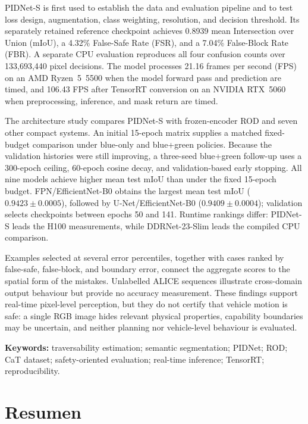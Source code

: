 \documentclass[12pt,a4paper]{report}
\begin{document}
PIDNet-S is first used to establish the data and evaluation pipeline and to
test loss design, augmentation, class weighting, resolution, and decision
threshold. Its separately retained reference checkpoint achieves 0.8939 mean
Intersection over Union (mIoU), a 4.32\% False-Safe Rate (FSR), and a 7.04\%
False-Block Rate (FBR). A separate CPU evaluation reproduces all four confusion
counts over 133,693,440 pixel decisions. The model processes 21.16 frames per
second (FPS) on an AMD Ryzen~5~5500 when the model forward pass and prediction
are timed, and 106.43 FPS after TensorRT conversion on an NVIDIA RTX~5060 when
preprocessing, inference, and mask return are timed.

The architecture study compares PIDNet-S with frozen-encoder ROD and seven
other compact systems. An initial 15-epoch matrix supplies a matched
fixed-budget comparison under blue-only and blue+green policies. Because the
validation histories were still improving, a three-seed blue+green follow-up
uses a 300-epoch ceiling, 60-epoch cosine decay, and validation-based early
stopping. All nine models achieve higher mean test mIoU than under the fixed
15-epoch budget. FPN/EfficientNet-B0 obtains the largest mean
test mIoU ($0.9423\pm0.0005$), followed by U-Net/EfficientNet-B0
($0.9409\pm0.0004$); validation selects checkpoints between epochs 50 and 141.
Runtime rankings differ: PIDNet-S leads the H100 measurements, while
DDRNet-23-Slim leads the compiled CPU comparison.

Examples selected at several error percentiles, together with cases ranked by
false-safe, false-block, and boundary error, connect the aggregate scores to
the spatial form of the mistakes. Unlabelled ALICE sequences illustrate
cross-domain output behaviour but provide no accuracy measurement. These
findings support real-time pixel-level perception, but they do not certify that
vehicle motion is safe: a single RGB image hides relevant physical properties,
capability boundaries may be uncertain, and neither planning nor vehicle-level
behaviour is evaluated.

\noindent\textbf{Keywords:} traversability estimation; semantic segmentation;
PIDNet; ROD; CaT dataset; safety-oriented evaluation; real-time inference;
TensorRT; reproducibility.

\clearpage
\chapter*{Resumen}
\end{document}
